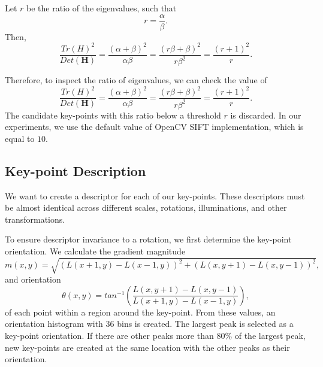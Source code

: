 Let $r$ be the ratio of the eigenvalues, such that
\begin{equation}
    r=\frac{\alpha}{\beta}.
\end{equation}
Then,
\begin{equation}
    \frac{Tr(H)^2}{Det(\boldsymbol{H})} = \frac{(\alpha+\beta)^2}{\alpha\beta}=\frac{(r\beta+\beta)^2}{r\beta^2} = \frac{(r+1)^2}{r}.
\end{equation}

Therefore, to inspect the ratio of eigenvalues, we can check the value of
\begin{equation}
    \frac{Tr(H)^2}{Det(\boldsymbol{H})} = \frac{(\alpha+\beta)^2}{\alpha\beta}=\frac{(r\beta+\beta)^2}{r\beta^2} = \frac{(r+1)^2}{r}.
\end{equation}
The candidate key-points with this ratio below a threshold $r$ is discarded. In our experiments, we use the default value of OpenCV SIFT implementation, which is equal to $10$.

\subsection{Key-point Description}
We want to create a descriptor for each of our key-points. These descriptors must be almost identical across different scales, rotations, illuminations, and other transformations.

To ensure descriptor invariance to a rotation, we first determine the key-point orientation. We calculate the gradient magnitude
\begin{equation}
    m(x,y) = \sqrt{(L(x+1,y)-L(x-1,y))^2+(L(x,y+1)-L(x,y-1))^2},
\end{equation}
and orientation
\begin{equation}
    \theta(x,y) = tan^{-1}\left(\frac{L(x,y+1)-L(x,y-1)}{L(x+1,y)-L(x-1,y)}\right),
\end{equation}
of each point within a region around the key-point. From these values, an orientation histogram with $36$ bins is created. The largest peak is selected as a key-point orientation. If there are other peaks more than $80\%$ of the largest peak, new key-points are created at the same location with the other peaks as their orientation.

